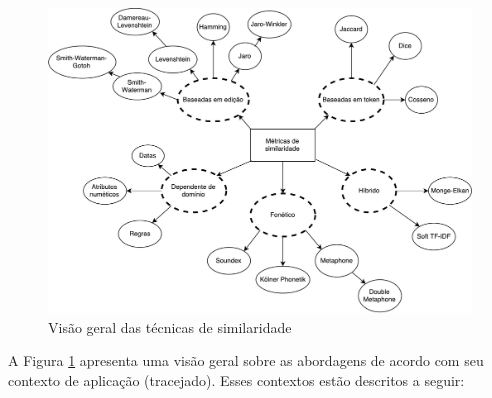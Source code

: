 \begin{figure}[!ht]
	\centering
	\includegraphics[width=1\textwidth]{./imagens/similarity-metrics.pdf}
	\caption{Visão geral das técnicas de similaridade}
	\label{fig:tecnicas_similaridade}
\end{figure}

A Figura \ref{fig:tecnicas_similaridade} apresenta uma visão geral sobre as abordagens de acordo com seu contexto de aplicação (tracejado). Esses contextos estão descritos a seguir:

